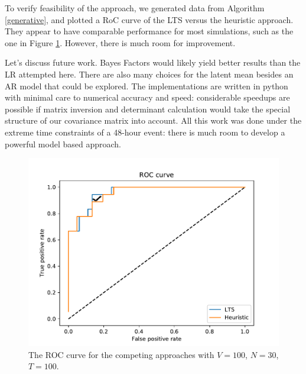 \documentclass[a4paper]{article}
\begin{document}
To verify feasibility of the approach, we generated data from Algorithm \ref{generative}, and plotted a RoC curve of the LTS versus the heuristic approach. They appear to have comparable performance for most simulations, such as the one in Figure \ref{fig:roc}. However, there is much room for improvement. 

Let's discuss future work. Bayes Factors would likely yield better results than the LR attempted here. There are also many choices for the latent mean besides an AR model that could be explored. The implementations are written in python with minimal care to numerical accuracy and speed: considerable speedups are possible if matrix inversion and determinant calculation would take the special structure of our covariance matrix into account. All this work was done under the extreme time constraints of a 48-hour event: there is much room to develop a powerful model based approach.

\begin{figure}[h]
    \centering
    \includegraphics[scale=0.8]{../images/roc.pdf}
    \caption{The ROC curve for the competing approaches with $V = 100$, $N = 30$, $T = 100$.}
    \label{fig:roc}
\end{figure}
\end{document}
